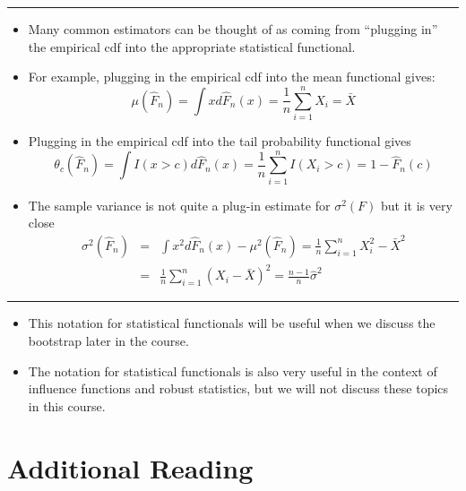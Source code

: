 \documentclass[]{book}
\begin{document}
\begin{center}\rule{0.5\linewidth}{\linethickness}\end{center}

\begin{itemize}
\item
  Many common estimators can be thought of as coming
  from ``plugging in'' the empirical cdf into the appropriate statistical functional.
\item
  For example, plugging in the empirical cdf into the mean functional gives:
  \begin{equation}
  \mu( \hat{F}_{n} ) = \int x d\hat{F}_{n}(x) = \frac{1}{n}\sum_{i=1}^{n} X_{i} = \bar{X}  \nonumber
  \end{equation}
\item
  Plugging in the empirical cdf into the tail probability functional gives
  \begin{equation}
  \theta_{c}( \hat{F}_{n} ) = \int I(x > c) d\hat{F}_{n}(x) = \frac{1}{n}\sum_{i=1}^{n}I(X_{i} > c)
  = 1 - \hat{F}_{n}(c) \nonumber
  \end{equation}
\item
  The sample variance is not quite a plug-in estimate for \(\sigma^{2}(F)\) but it is very close
  \begin{eqnarray}
  \sigma^{2}(\hat{F}_{n})
  &=& \int x^{2} d\hat{F}_{n}(x) - \mu^{2}(\hat{F}_{n})
  = \frac{1}{n} \sum_{i=1}^{n} X_{i}^{2} - \bar{X}^{2} \nonumber \\
  &=& \frac{1}{n} \sum_{i=1}^{n} (X_{i} - \bar{X})^{2}
  = \frac{n-1}{n} \hat{\sigma}^{2} \nonumber 
  \end{eqnarray}
\end{itemize}

\begin{center}\rule{0.5\linewidth}{\linethickness}\end{center}

\begin{itemize}
\item
  This notation for statistical functionals will be useful when we discuss the bootstrap later in
  the course.
\item
  The notation for statistical functionals is also very useful in the context
  of influence functions and robust statistics, but we will not discuss these
  topics in this course.
\end{itemize}

\hypertarget{additional-reading-2}{%
\section{Additional Reading}\label{additional-reading-2}}
\end{document}
